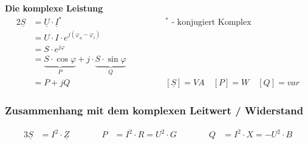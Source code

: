 \textbf{Die komplexe Leistung}
\begin{alignat*}{2}
\underline{S}&=\underline{U}\cdot\underline{I}^* &\quad\quad\quad& ^*\text{ - konjugiert Komplex} \\
	     &=U \cdot I \cdot e^{j\left(\varphi_u - \varphi_i\right)} \\
	     &=S \cdot e^{j\varphi} \\
	     &=\underbrace{S \cdot \cos\varphi}_P + j \cdot \underbrace{S \cdot \sin\varphi}_Q \\
	     &=P + j Q &\quad\quad& \left[\underline{S}\right] = VA \quad \left[P\right] = W \quad \left[Q\right] = var
\end{alignat*}

\subsubsection*{Zusammenhang mit dem komplexen Leitwert / Widerstand}
\begin{alignat*}{3}
\underline{S} &= I^2 \cdot \underline{Z} &\quad\quad\quad  P &= I^2 \cdot R = U^2 \cdot G &\quad\quad\quad Q &= I^2 \cdot X = -U^2 \cdot B
\end{alignat*}